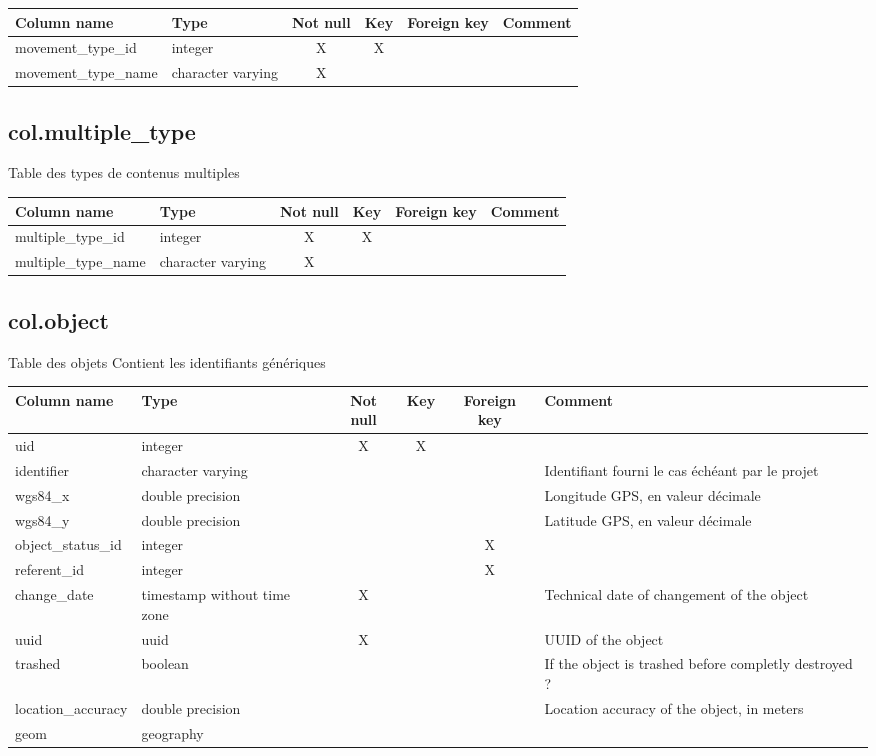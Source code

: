 \begin{tabular}{|l| p{2cm}|c|c|c| p{3cm}|}
\hline
Column name & Type & Not null & Key & Foreign key & Comment \\
\hline
movement\_type\_id & integer & X & X & & \\
\hline
movement\_type\_name & character varying & X & & & \\
\hline
\end{tabular}
\subsection{col.multiple\_type}
Table des types de contenus multiples

\begin{tabular}{|l| p{2cm}|c|c|c| p{3cm}|}
\hline
Column name & Type & Not null & Key & Foreign key & Comment \\
\hline
multiple\_type\_id & integer & X & X & & \\
\hline
multiple\_type\_name & character varying & X & & & \\
\hline
\end{tabular}
\subsection{col.object}
Table des objets Contient les identifiants génériques

\begin{tabular}{|l| p{2cm}|c|c|c| p{3cm}|}
\hline
Column name & Type & Not null & Key & Foreign key & Comment \\
\hline
uid & integer & X & X & & \\
\hline
identifier & character varying & & & & Identifiant fourni le cas échéant par le projet\\
\hline
wgs84\_x & double precision & & & & Longitude GPS, en valeur décimale\\
\hline
wgs84\_y & double precision & & & & Latitude GPS, en valeur décimale\\
\hline
object\_status\_id & integer & & & X & \\
\hline
referent\_id & integer & & & X & \\
\hline
change\_date & timestamp without time zone & X & & & Technical date of changement of the object\\
\hline
uuid & uuid & X & & & UUID of the object\\
\hline
trashed & boolean & & & & If the object is trashed before completly destroyed ?\\
\hline
location\_accuracy & double precision & & & & Location accuracy of the object, in meters\\
\hline
geom & geography & & & & \\
\hline
\end{tabular}
